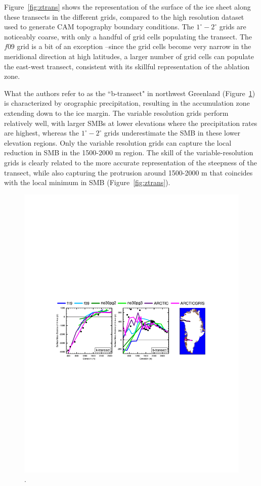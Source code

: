 \documentclass[draft]{agujournal2019}
\begin{document}
Figure~\ref{fig:ztrans} shows the representation of the surface of the ice sheet along these transects in the different grids, compared to the high resolution dataset used to generate CAM topography boundary conditions. The $1^{\circ}-2^{\circ}$ grids are noticeably coarse, with only a handful of grid cells populating the transect. The $f09$ grid is a bit of an exception --since the grid cells become very narrow in the meridional direction at high latitudes, a larger number of grid cells can populate the east-west transect, consistent with its skillful representation of the ablation zone.

What the authors refer to as the ``b-transect" in northwest Greenland (Figure~\ref{fig:trans}) is characterized by orographic precipitation, resulting in the accumulation zone extending down to the ice margin. The variable resolution grids perform relatively well, with larger SMBs at lower elevations where the precipitation rates are highest, whereas the $1^{\circ}-2^{\circ}$ grids underestimate the SMB in these lower elevation regions. Only the variable resolution grids can capture the local reduction in SMB in the 1500-2000 m region. The skill of the variable-resolution grids is clearly related to the more accurate representation of the steepness of the transect, while also capturing the protrusion around 1500-2000 m that coincides with the local minimum in SMB (Figure~\ref{fig:ztrans}).

\begin{figure}[t]
\begin{center}
         \includegraphics[width=130mm]{figs/temp_transect_obsperiod.pdf}
\end{center}
\caption{.}
\label{fig:trans}
\end{figure}
\end{document}
